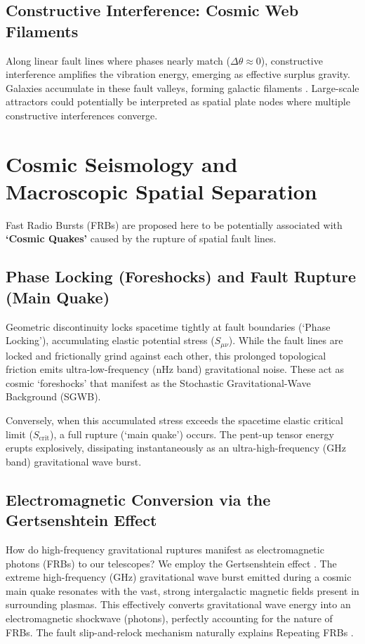 \documentclass[reprint,amsmath,amssymb,aps,prd]{revtex4-2}
\begin{document}
\subsection{Constructive Interference: Cosmic Web Filaments}
Along linear fault lines where phases nearly match ($\Delta\theta \approx 0$), constructive interference amplifies the vibration energy, emerging as effective surplus gravity. Galaxies accumulate in these fault valleys, forming galactic filaments \cite{Bond1996}. Large-scale attractors could potentially be interpreted as spatial plate nodes where multiple constructive interferences converge.

\section{Cosmic Seismology and Macroscopic Spatial Separation}
Fast Radio Bursts (FRBs) \cite{Lorimer2007} are proposed here to be potentially associated with \textbf{`Cosmic Quakes'} caused by the rupture of spatial fault lines.

\subsection{Phase Locking (Foreshocks) and Fault Rupture (Main Quake)}
Geometric discontinuity locks spacetime tightly at fault boundaries (`Phase Locking'), accumulating elastic potential stress ($S_{\mu\nu}$). While the fault lines are locked and frictionally grind against each other, this prolonged topological friction emits ultra-low-frequency (nHz band) gravitational noise. These act as cosmic `foreshocks' that manifest as the Stochastic Gravitational-Wave Background (SGWB).

Conversely, when this accumulated stress exceeds the spacetime elastic critical limit ($S_{\mathrm{crit}}$), a full rupture (`main quake') occurs. The pent-up tensor energy erupts explosively, dissipating instantaneously as an ultra-high-frequency (GHz band) gravitational wave burst.

\subsection{Electromagnetic Conversion via the Gertsenshtein Effect}
How do high-frequency gravitational ruptures manifest as electromagnetic photons (FRBs) to our telescopes? We employ the Gertsenshtein effect \cite{Gertsenshtein1961}. The extreme high-frequency (GHz) gravitational wave burst emitted during a cosmic main quake resonates with the vast, strong intergalactic magnetic fields present in surrounding plasmas. This effectively converts gravitational wave energy into an electromagnetic shockwave (photons), perfectly accounting for the nature of FRBs. The fault slip-and-relock mechanism naturally explains Repeating FRBs \cite{CHIME2020}.
\end{document}
